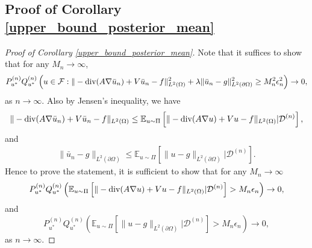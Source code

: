 \documentclass{article}
\newcommand{\E}{\mathbb{E}}
\newcommand{\F}{\mathcal{F}}
\newcommand{\D}{\mathcal{D}}
\renewcommand{\div}{\textnormal{div}}
\theoremstyle{plain}
\theoremstyle{definition}
\theoremstyle{remark}
\begin{document}
\subsection{Proof of Corollary \ref{upper_bound_posterior_mean}}
\begin{proof}[Proof of Corollary \ref{upper_bound_posterior_mean}]
    Note that it suffices to show that for any $M_n \to \infty$,
    \begin{align*}
        P_{u^*}^{(n)} Q_{u^*}^{(n)} \left(u \in \F: \|-\div(A \nabla \bar{u}_n ) + V \bar{u}_n  -f\|_{L^2(\Omega)}^2 + \lambda \|\bar{u}_n - g\|_{L^2(\partial \Omega)}^2 \geq M_n^2 \epsilon_n^2\right) \to 0,
    \end{align*}
    as $n \to \infty$. 
    Also by Jensen's inequality, we have
    \begin{align*}
         \|-\div(A \nabla \bar{u}_n ) + V \bar{u}_n  -f\|_{L^2(\Omega)} \leq \E_{u \sim \Pi} \left[ \|-\div(A \nabla u) + V u -f\|_{L^2(\Omega)} | \D^{(n)}\right], 
    \end{align*}
    and 
    \begin{align*}
        \|\bar{u}_n - g\|_{L^2(\partial \Omega)} \leq \E_{u \sim \Pi} \left[\|u -g\|_{L^2(\partial \Omega)} | \D^{(n)}\right]. 
    \end{align*}
    Hence to prove the statement, it is sufficient to show that for any $M_n \to \infty$
    \begin{equation} \label{posterior_mean_domain}
         P_{u^*}^{(n)} Q_{u^*}^{(n)} \left( \E_{u \sim \Pi} \left[ \|-\div(A \nabla u) + V u -f\|_{L^2(\Omega)} | \D^{(n)}\right] > M_n \epsilon_n \right) \to 0,
    \end{equation}
    and 
    \begin{equation} \label{posterior_mean_boundary}
        P_{u^*}^{(n)} Q_{u^*}^{(n)} \left(\E_{u \sim \Pi} \left[\|u -g\|_{L^2(\partial \Omega)} | \D^{(n)}\right] > M_n \epsilon_n \right) \to 0,
    \end{equation}
    as $n \to \infty$.
    

\end{proof}
\end{document}
